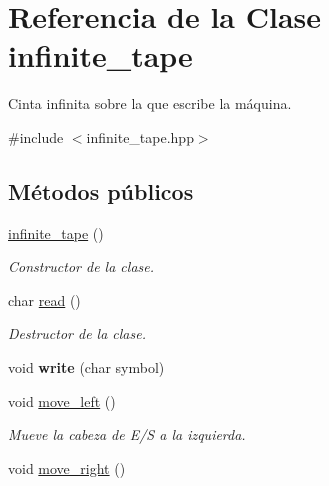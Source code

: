 \hypertarget{classinfinite__tape}{}\section{Referencia de la Clase infinite\+\_\+tape}
\label{classinfinite__tape}


Cinta infinita sobre la que escribe la máquina.  




{\ttfamily \#include $<$infinite\+\_\+tape.\+hpp$>$}

\subsection*{Métodos públicos}
\begin{DoxyCompactItemize}
\item 
\hypertarget{classinfinite__tape_a1683239d955d4d8d7fc9bed7cf11ba2b}{}\hyperlink{classinfinite__tape_a1683239d955d4d8d7fc9bed7cf11ba2b}{infinite\+\_\+tape} ()\label{classinfinite__tape_a1683239d955d4d8d7fc9bed7cf11ba2b}

\begin{DoxyCompactList}\small\item\em Constructor de la clase. \end{DoxyCompactList}\item 
\hypertarget{classinfinite__tape_a626dd6d9b2f5f9ad47328b73b1946a11}{}char \hyperlink{classinfinite__tape_a626dd6d9b2f5f9ad47328b73b1946a11}{read} ()\label{classinfinite__tape_a626dd6d9b2f5f9ad47328b73b1946a11}

\begin{DoxyCompactList}\small\item\em Destructor de la clase. \end{DoxyCompactList}\item 
\hypertarget{classinfinite__tape_a06f510b31fe9470d5120082e175f1a80}{}void {\bfseries write} (char symbol)\label{classinfinite__tape_a06f510b31fe9470d5120082e175f1a80}

\item 
\hypertarget{classinfinite__tape_a8e511f932fd1a7b4495dc497bf2522e6}{}void \hyperlink{classinfinite__tape_a8e511f932fd1a7b4495dc497bf2522e6}{move\+\_\+left} ()\label{classinfinite__tape_a8e511f932fd1a7b4495dc497bf2522e6}

\begin{DoxyCompactList}\small\item\em Mueve la cabeza de E/\+S a la izquierda. \end{DoxyCompactList}\item 
\hypertarget{classinfinite__tape_a8cbbbe64044862ee674df2991bf34972}{}void \hyperlink{classinfinite__tape_a8cbbbe64044862ee674df2991bf34972}{move\+\_\+right} ()\label{classinfinite__tape_a8cbbbe64044862ee674df2991bf34972}


\end{DoxyCompactItemize}
